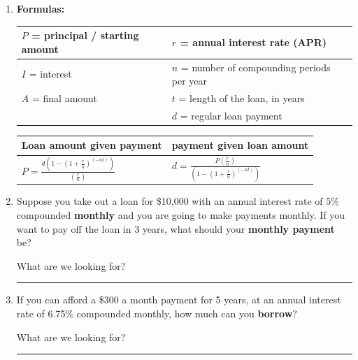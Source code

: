 \documentclass[12pt]{article}
\renewcommand{\emph}[1]{\textsf{\textbf{#1}}}
\newcommand{\ans}[1][1in]{\rule{#1}{.5pt}}
\begin{document}
\begin{enumerate}
\begin{enumerate}
{	}
	
	Number of years \ans\ Final payment \ans
	
	\item How much did you pay in total? How much was interest?
	\vfill
	\vfill
	\item What happens if you \emph{increase} your annual payments to \$800?
	\vfill
	\item What happens if you \emph{decrease} your annual payments to \$300?
	\vfill
	\end{enumerate}
\newpage
	
	\item \emph{Formulas:}
	
	\begin{tabular}{| l | l |}
\hline
$P$ = principal / starting amount & $r$ = annual interest rate (APR) \\ \hline
$I$ = interest & $n$ = number of compounding periods per year\\ \hline
$A$ = final amount & $t$ = length of the loan, in years\\ \hline
& $d$ = regular loan payment \\ \hline
\end{tabular}


\begin{center}
\begin{tabularx}{.8\linewidth}{|X | X|} 
\hline
Loan amount given payment & payment given loan amount\\ \hline
$\displaystyle P = \frac{d\left(1 - \left(1+\frac{r}{n}\right)^{(-nt)}\right)}{\left(\frac{r}{n}\right)}$ & $\displaystyle d = \frac{P\left(\frac{r}{n}\right)}{\left(1 - \left(1+\frac{r}{n}\right)^{(-nt)}\right)}$\\
\hline
\end{tabularx}
\end{center}


\item Suppose you take out a loan for \$10,000 with an annual interest rate of 5\% compounded \emph{monthly} and you are going to make payments monthly. If you want to pay off the loan in 3 years, what should your \emph{monthly payment} be? 

What are we looking for? \ans
\vfill


\item If you can afford a \$300 a month payment for 5 years, at an annual interest rate of 6.75\% compounded monthly, how much can you \emph{borrow}?   

What are we looking for? \ans

\vfill
	
	



\end{enumerate}
\end{document}
